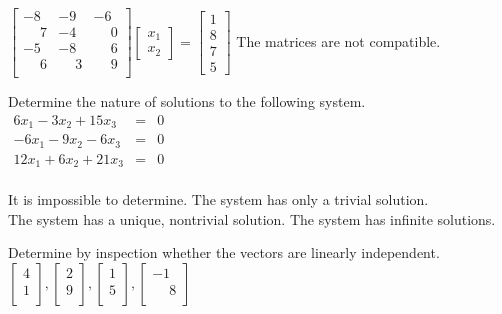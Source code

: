 \documentclass[11pt]{exam}
\begin{document}
\begin{questions}
\begin{oneparchoices}
\choice $\left[\begin{array}{ccc}-8 & -9 & -6 \\ \phantom{-}7 & -4 & \phantom{-}0 \\ -5 & -8 & \phantom{-}6 \\ \phantom{-}6 & \phantom{-}3 & \phantom{-}9 \\ \end{array}\right] \left[\begin{array}{c}x_{1}\\x_{2}\end{array}\right]= \left[\begin{array}{c}1\\8\\7\\5\end{array}\right]$
\choice The matrices are not compatible. 
\end{oneparchoices}
\answerline

\addpoints
\question[2]
Determine the nature of solutions to the following system. \newline$ \begin{array}{cccc}6x_{1}-3x_{2} +15x_{3}& = & 0 \\ -6x_{1}-9x_{2} -6x_{3}& = & 0 \\ 12x_{1}+6x_{2} +21x_{3}& = & 0 \\ \end{array} $

\begin{oneparchoices}
\choice It is impossible to determine.
\choice The system has only a trivial solution.\\
\choice The system has a unique, nontrivial solution.
\choice The system has infinite solutions.  %
\end{oneparchoices}
\answerline

\addpoints
\question[2]
Determine by inspection whether the vectors are linearly independent.\newline
$\left[\begin{array}{c} 4 \\ 1 \\ \end{array}\right], \left[\begin{array}{c} 2 \\ 9 \\ \end{array}\right], \left[\begin{array}{c} 1 \\ 5 \\ \end{array}\right], \left[\begin{array}{c} -1 \\ \phantom{-}8 \\ \end{array}\right]$


\end{questions}
\end{document}
